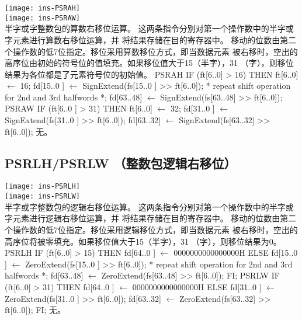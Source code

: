 \begin{instructionblk}
  \texttt{[image: ins-PSRAH]} \\
  \texttt{[image: ins-PSRAW]} \\
  {半字或字整数包的算数右移位运算。}
  {这两条指令分别对第一个操作数中的半字或字元素进行算数右移位运算，并
  将结果存储在目的寄存器中。
  移动的位数由第二个操作数的低7位指定。移位采用算数移位方式，即当数据元素
  被右移时，空出的高序位由初始的符号位的值填充。如果移位值大于15（半字），31
  （字），则移位结果为各位都是了元素符号位的初始值。}
  {PSRAH \narrownewline
  IF (ft[6..0] > 16) THEN ft[6..0] $\leftarrow$ 16; \narrownewline
  fd[15..0 ] $\leftarrow$ SignExtend(fs[15..0 ] >> ft[6..0]); \narrownewline
  * repeat shift operation for 2nd and 3rd halfwords *; \narrownewline
  fd[63..48] $\leftarrow$ SignExtend(fs[63..48] >> ft[6..0]); \narrownewline \narrownewline
  PSRAW \narrownewline
  IF (ft[6..0 ] > 31) THEN ft[6..0] $\leftarrow$ 32; \narrownewline
  fd[31..0 ] $\leftarrow$ SignExtend(fs[31..0 ] >> ft[6..0]); \narrownewline
  fd[63..32] $\leftarrow$ SignExtend(fs[63..32] >> ft[6..0]);}
  {无。}
\end{instructionblk}

\subsection{PSRLH/PSRLW （整数包逻辑右移位）}

\begin{instructionblk}
  \texttt{[image: ins-PSRLH]} \\
  \texttt{[image: ins-PSRLW]} \\
  {半字或字整数包的逻辑右移位运算。}
  {这两条指令分别对第一个操作数中的半字或字元素进行逻辑右移位运算，并
  将结果存储在目的寄存器中。
  移动的位数由第二个操作数的低7位指定。移位采用逻辑移位方式，即当数据元素
  被右移时，空出的高序位将被零填充。如果移位值大于15（半字），31
  （字），则移位结果为0。}
  {PSRLH \narrownewline
  IF (ft[6..0] > 15) \narrownewline
  THEN \narrownewline
  \mbox{\hspace{.5cm}} fd[64..0 ] $\leftarrow$ 0000000000000000H \narrownewline
  ELSE \narrownewline
  \mbox{\hspace{.5cm}} fd[15..0 ] $\leftarrow$ ZeroExtend(fs[15..0 ] >> ft[6..0]); \narrownewline
  \mbox{\hspace{.5cm}} * repeat shift operation for 2nd and 3rd halfwords *; \narrownewline
  \mbox{\hspace{.5cm}} fd[63..48] $\leftarrow$ ZeroExtend(fs[63..48] >> ft[6..0]); \narrownewline
  FI; \narrownewline \narrownewline
  PSRLW \narrownewline
  IF (ft[6..0] > 31) \narrownewline
  THEN \narrownewline
  \mbox{\hspace{.5cm}} fd[64..0 ] $\leftarrow$ 0000000000000000H \narrownewline
  ELSE \narrownewline
  \mbox{\hspace{.5cm}} fd[31..0 ] $\leftarrow$ ZeroExtend(fs[31..0 ] >> ft[6..0]); \narrownewline
  \mbox{\hspace{.5cm}} fd[63..32] $\leftarrow$ ZeroExtend(fs[63..32] >> ft[6..0]); \narrownewline
  FI;}
  {无。}
\end{instructionblk}

